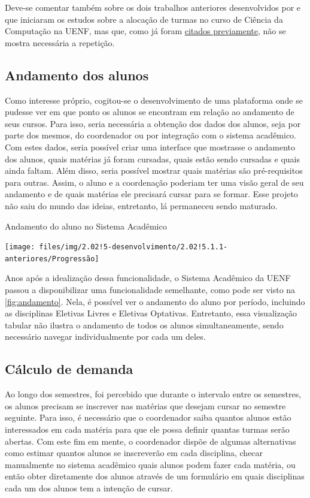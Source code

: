 Deve-se comentar também sobre os dois trabalhos anteriores desenvolvidos por  e  que iniciaram os estudos sobre a alocação de turmas no curso de Ciência da Computação na UENF, mas que, como já foram \hyperref[sec:anteriores]{citados previamente}, não se mostra necessária a repetição.

\subsection{Andamento dos alunos} \label{ssec:andamento} %

Como interesse próprio, cogitou-se o desenvolvimento de uma plataforma onde se pudesse ver em que ponto os alunos se encontram em relação ao andamento de seus cursos. Para isso, seria necessária a obtenção dos dados dos alunos, seja por parte dos mesmos, do coordenador ou por integração com o sistema acadêmico. Com estes dados, seria possível criar uma interface que mostrasse o andamento dos alunos, quais matérias já foram cursadas, quais estão sendo cursadas e quais ainda faltam. Além disso, seria possível mostrar quais matérias são pré-requisitos para outras. Assim, o aluno e a coordenação poderiam ter uma visão geral de seu andamento e de quais matérias ele precisará cursar para se formar. Esse projeto não saiu do mundo das ideias, entretanto, lá permaneceu sendo maturado.

\begin{MyCenteredFigure} \caption{Andamento do aluno no Sistema Acadêmico} \label{fig:andamento}
  \texttt{[image: files/img/2.02!5-desenvolvimento/2.02!5.1.1-anteriores/Progressão]}
\end{MyCenteredFigure}

Anos após a idealização dessa funcionalidade, o Sistema Acadêmico da UENF passou a disponibilizar uma funcionalidade semelhante, como pode ser visto na \autoref{fig:andamento}. Nela, é possível ver o andamento do aluno por período, incluindo as disciplinas Eletivas Livres e Eletivas Optativas. Entretanto, essa visualização tabular não ilustra o andamento de todos os alunos simultaneamente, sendo necessário navegar individualmente por cada um deles.

\subsection{Cálculo de demanda} \label{ssec:demanda} %

Ao longo dos semestres, foi percebido que durante o intervalo entre os semestres, os alunos precisam se inscrever nas matérias que desejam cursar no semestre seguinte. Para isso, é necessário que o coordenador saiba quantos alunos estão interessados em cada matéria para que ele possa definir quantas turmas serão abertas. Com este fim em mente, o coordenador dispõe de algumas alternativas como estimar quantos alunos se inscreverão em cada disciplina, checar manualmente no sistema acadêmico quais alunos podem fazer cada matéria, ou então obter diretamente dos alunos através de um formulário em quais disciplinas cada um dos alunos tem a intenção de cursar.

